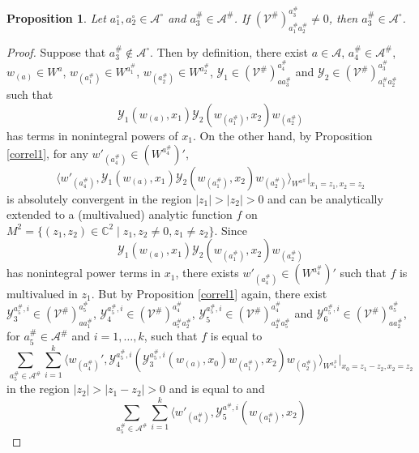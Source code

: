 \documentclass{amsproc}
\newtheorem{prop}[thm]{Proposition}
\theoremstyle{definition}
\theoremstyle{remark}
\numberwithin{equation}{section}
\begin{document}
\begin{prop}\label{intertwining}
Let $a^{\circ}_{1}, a^{\circ}_{2}\in \mathcal{A}^{\circ}$
and  $a^{\#}_{3}\in \mathcal{A}^{\#}$. If
$(\mathcal{V}^{\#})_{a^{\#}_{1}a^{\#}_{2}}^{a^{\#}_{3}}\ne 0$, 
then $a^{\#}_{3}\in
\mathcal{A}^{\circ}$.
\end{prop}
\begin{proof}
Suppose that $a^{\#}_{3}\not\in \mathcal{A}^{\circ}$. Then by definition,
there exist $a\in \mathcal{A}$, $a^{\#}_{4}\in \mathcal{A}^{\#}$,
$w_{(a)}\in W^{a}$, $w_{(a^{\#}_{1})}\in W^{a^{\#}_{1}}$,
$w_{(a^{\#}_{2})}\in W^{a^{\#}_{2}}$,
$\mathcal{Y}_{1}\in (\mathcal{V}^{\#})_{aa^{\#}_{3}}^{a_{4}^{\#}}$
and $\mathcal{Y}_{2}\in 
(\mathcal{V}^{\#})_{a^{\#}_{1}a^{\#}_{2}}^{a^{\#}_{3}}$
such that 
$$\mathcal{Y}_{1}(w_{(a)}, x_{1})\mathcal{Y}_{2}(w_{(a^{\#}_{1})}, x_{2})
w_{(a^{\#}_{2})}$$
has terms in nonintegral powers of $x_{1}$.
On the other hand, by Proposition \ref{correl1}, for any 
$w'_{(a^{\#}_{4})}\in (W^{a^{\#}_{4}})'$, 
$$\langle w'_{(a^{\#}_{4})}, 
\mathcal{Y}_{1}(w_{(a)}, x_{1})\mathcal{Y}_{2}(w_{(a^{\#}_{1})}, x_{2})
w_{(a^{\#}_{2})}\rangle_{W^{a^{\#}}}|_{x_{1}=z_{1},
x_{2}=z_{2}}$$
is absolutely convergent in the region $|z_{1}|>|z_{2}|>0$ and 
can be analytically extended to a (multivalued) analytic function $f$
on $M^{2}=\{(z_{1},
z_{2})\in \mathbb{C}^{2}\;|\;z_{1}, z_{2}\ne 0, z_{1}\ne
z_{2}\}$. 
Since 
$$\mathcal{Y}_{1}(w_{(a)}, x_{1})\mathcal{Y}_{2}
(w_{(a^{\#}_{1})}, x_{2})
w_{(a^{\#}_{2})}$$
has nonintegral power terms in $x_{1}$, there exists  
$w'_{(a^{\#}_{4})}\in (W^{a^{\#}_{4}})'$ such that 
$f$ is multivalued in $z_{1}$. But by Proposition \ref{correl1}
again, there exist $\mathcal{Y}^{a^{\#}_{5}, i}_{3}
\in (\mathcal{V}^{\#})_{aa^{\#}_{1}}^{a^{\#}_{5}}$,  
$\mathcal{Y}^{a^{\#}_{5},i}_{4}\in 
(\mathcal{V}^{\#})_{a^{\#}_{5}a^{\#}_{2}}^{a^{\#}_{4}}$, 
$\mathcal{Y}^{a^{\#}_{5},i}_{5}
\in (\mathcal{V}^{\#})_{a^{\#}_{2}a^{\#}_{5}}^{a^{\#}_{4}}$ and 
$\mathcal{Y}^{a^{\#}_{5}, i}_{6}\in 
(\mathcal{V}^{\#})_{aa^{\#}_{2}}^{a^{\#}_{5}}$, 
for $a^{\#}_{5}\in \mathcal{A}^{\#}$ and $i=1, \dots, k$, such that
$f$ is equal to 
$$\sum_{a^{\#}_{5}\in \mathcal{A}^{\#}}\sum_{i=1}^{k}
\langle w_{(a^{\#}_{4})}', \mathcal{Y}^{a^{\#}_{5}, i}_{4}
(\mathcal{Y}^{a^{\#}_{5}, i}_{3}(w_{(a)},
x_{0})w_{(a^{\#}_{1})}, x_{2})w_{(a^{\#}_{2})}\rangle_{W^{a^{\#}_{4}}}
|_{x_{0}=z_{1}-z_{2},
x_{2}=z_{2}}$$
in the region $|z_{2}|>|z_{1}-z_{2}|>0$ and is equal to
and
$$\sum_{a^{\#}_{5}\in \mathcal{A}^{\#}}
\sum_{i=1}^{k}\langle w'_{(a^{\#}_{4})}, 
\mathcal{Y}_{5}^{a^{\#},i}(w_{(a^{\#}_{1})}, x_{2})
$$
\end{proof}
\end{document}
